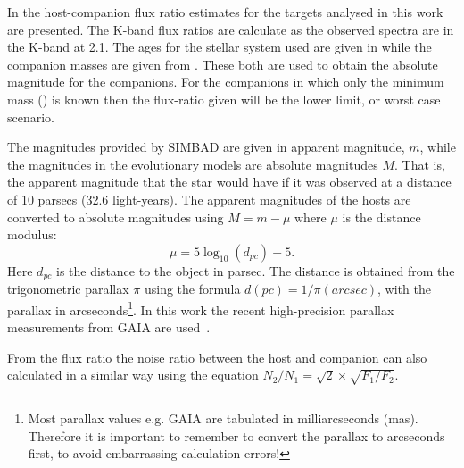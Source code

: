 In  the host-companion flux ratio estimates for the targets analysed in this work are presented. The {K}-band flux ratios are calculate as the observed spectra are in the {K}-band at 2.1\um{}. The ages for the stellar system used are given in  while the companion masses are given from . These both are used to obtain the absolute magnitude for the companions. For the companions in which only the minimum mass (\mtwosini{}) is known then the flux-ratio given will be the lower limit, or worst case scenario.


The magnitudes provided by {SIMBAD} are given in apparent magnitude, $m$, while the magnitudes in the evolutionary models are absolute magnitudes $M$. That is, the apparent magnitude that the star would have if it was observed at a distance of 10 parsecs (32.6 light-years). The apparent magnitudes of the hosts are converted to absolute magnitudes using \(M = m - \mu\) where \(\mu\) is the distance modulus:
\begin{equation}
\mu = 5 \log_{10}(d_{pc}) -5. \label{eqn:distance_modulus}
\end{equation}
Here $d_{pc}$ is the distance to the object in parsec. The distance is obtained from the trigonometric parallax  $\pi$ using the formula $d(pc) = 1 /\pi(arcsec)$, with the parallax in arcseconds\footnote{Most parallax values e.g. GAIA are tabulated in milliarcseconds (mas). Therefore it is important to remember to convert the parallax to arcseconds first, to avoid embarrassing calculation errors!}. In this work the recent high-precision parallax measurements from GAIA are used~\citet{collaboration_gaia_2018}.

From the flux ratio the noise ratio between the host and companion can also calculated in a similar way using the equation \(N_{2}/N_{1} = \sqrt{2} \times\sqrt{F_{1}/F_{2}}\).


